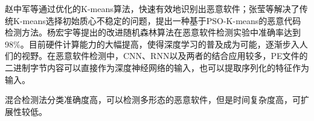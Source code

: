 赵中军等\cite{赵中军2018基于优化}通过优化的K-means算法，快速有效地识别出恶意软件；张莹等\cite{张莹2018基于网络行为特征聚类分析的恶意代码检测技术研究}解决了传统K-means选择初始质心不稳定的问题，提出一种基于PSO-K-means的恶意代码检测方法。杨宏宇等\cite{杨宏宇2017基于改进随机森林算法的}提出的改进随机森林算法在恶意软件检测实验中准确率达到98\%。目前硬件计算能力的大幅提高，使得深度学习的普及成为可能，逐渐步入人们的视野。在恶意软件检测中，CNN、RNN以及两者的结合应用较多，PE文件的二进制字节内容可以直接作为深度神经网络的输入\cite{王蕊2012基于语义的恶意代码行为特征提取及检测方法}，也可以提取序列化的特征作为输入\cite{李鹏2012基于空间关系特征的未知恶意代码自动检测技术研究,watson2015malware,毛蔚轩2017一种基于主动学习的恶意代码检测方法}。
 
混合检测法分类准确度高，可以检测多形态的恶意软件，但是时间复杂度高，可扩展性较低。
 
 
